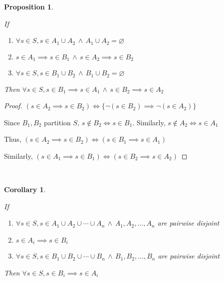 \documentclass{article}
\newtheorem*{thm}{Proposition}
\newtheorem*{corollary}{Corollary}
\theoremstyle{definition}\newtheorem{definition}{Definition}
\begin{document}
	\begin{thm}\
	
	If
		\begin{enumerate}
			\item $\forall s \in S, s\in A_1 \cup A_2 \, \land \, A_1 \cup A_2 = \varnothing$ 
			\item $s\in A_1 \implies s \in B_1 \, \land \, s\in A_2 \implies s \in B_2$
			\item $\forall s \in S, s\in B_1 \cup B_2 \, \land \, B_1 \cup B_2 = \varnothing$
		\end{enumerate}
	Then $\forall s \in S, s\in B_1 \implies s \in A_1 \, \land \, s\in B_2 \implies s \in A_2$
	\end{thm}

	\begin{proof}
			$(s\in A_2 \implies s \in B_2) \iff \{ \lnot (s \in B_2) \implies \lnot (s\in A_2) \}$
			
			Since $B_1, B_2$ partition $S$, $s \not\in B_2 \iff s\in B_1$. Similarly, $s \not\in A_2 \iff s\in A_1$ 
			
			Thus, $(s\in A_2 \implies s \in B_2) \iff (s\in B_1 \implies s \in A_1)$
			
			Similarly, $(s\in A_1 \implies s \in B_1) \iff (s\in B_2 \implies s \in A_2)$ 
	\end{proof}
	
\	
	\begin{corollary}\
	
	If
		\begin{enumerate}
			\item $\forall s \in S, s\in A_1 \cup A_2 \cup \cdots \cup A_n \, \land \, A_1,A_2,\ldots,A_n$ are pairwise disjoint
			\item $s\in A_i \implies s \in B_i$
			\item $\forall s \in S, s\in B_1 \cup B_2 \cup \cdots \cup B_n \, \land \, B_1,B_2,\ldots,B_n$ are pairwise disjoint
		\end{enumerate}
	Then $\forall s \in S, s\in B_i \implies s \in A_i$
	\end{corollary}
\end{document}
